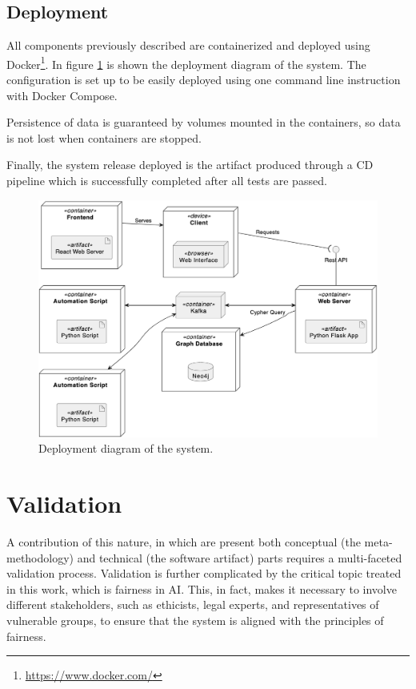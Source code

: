 \documentclass[12pt,a4paper,openright,twoside]{book}
\begin{document}
\section{Deployment}

All components previously described are containerized and deployed using Docker\footnote{\href{https://www.docker.com/}{https://www.docker.com/}}.
%
In figure \cref{fig:deployment} is shown the deployment diagram of the system.
%
The configuration is set up to be easily deployed using one command line instruction with Docker Compose.

Persistence of data is guaranteed by volumes mounted in the containers, so data is not lost when containers are stopped.

Finally, the system release deployed is the artifact produced through a \ac{CD} pipeline which is successfully completed after all tests are passed.


\begin{figure}
    \centering
    \includegraphics[width=\linewidth]{figures/diagrams/deployment.png}
    \caption{
        Deployment diagram of the system.
    }
    \label{fig:deployment}
\end{figure}


\chapter{Validation}%
\label{chap:validation}

A contribution of this nature, in which are present both conceptual (the meta-methodology) and technical (the software artifact) parts requires a multi-faceted validation process.
%
Validation is further complicated by the critical topic treated in this work, which is fairness in \ac{AI}.
%
This, in fact, makes it necessary to involve different stakeholders, such as ethicists, legal experts, and representatives of vulnerable groups, to ensure that the system is aligned with the principles of fairness.
\end{document}
